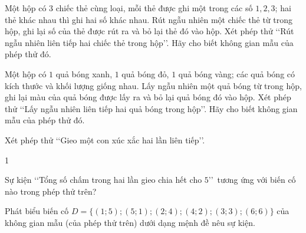 \begin{vd}%
	Một hộp có $3$ chiếc thẻ cùng loại, mỗi thẻ được ghi một trong các số $1,2,3$; hai thẻ khác nhau thì ghi hai số khác nhau. Rút ngẫu nhiên một chiếc thẻ từ trong hộp, ghi lại số của thẻ được rút ra và bỏ lại thẻ đó vào hộp. Xét phép thử \lq\lq Rút ngẫu nhiên liên tiếp hai chiếc thẻ trong hộp\rq\rq. Hãy cho biết không gian mẫu của phép thử đó.
\end{vd}

\begin{vd}%
	Một hộp có $1$ quả bóng xanh, $1$ quả bóng đỏ, $1$ quả bóng vàng; các quả bóng có kích thước và khối lượng giống nhau. Lấy ngẫu nhiên một quả bóng từ trong hộp, ghi lại màu của quả bóng được lấy ra và bỏ lại quả bóng đó vào hộp. Xét phép thử \lq\lq Lấy ngẫu nhiên liên tiếp hai quả bóng trong hộp\rq\rq. Hãy cho biết không gian mẫu của phép thử đó.
\end{vd}

\begin{vd}%
	Xét phép thử \lq\lq Gieo một con xúc xắc hai lần liên tiếp\rq\rq.
	\begin{enumEX}[a)]{1}
		\item Sự kiện \lq\lq Tổng số chấm trong hai lần gieo chia hết cho $5$\rq\rq\, tương ứng với biến cố nào trong phép thử trên?
		\item Phát biểu biến cố $D=\{(1;5);(5;1);(2;4);(4;2);(3;3);(6;6)\}$ của không gian mẫu (của phép thử trên) dưới dạng mệnh đề nêu sự kiện.
	\end{enumEX}
\end{vd}

